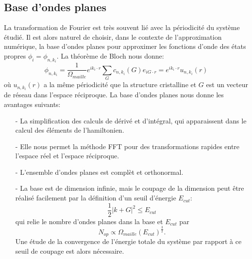\subsection{Base d'ondes planes}
\label{subsec-planewave}
La transformation de Fourier est très souvent lié avec la périodicité du système étudié.
Il est alors naturel de choisir, dans le contexte de l'approximation numérique,
la base d'ondes planes pour approximer les fonctions d'onde des états propres $\phi_i = \phi_{n,k_i}$.
La théorème de Bloch nous donne:
\begin{equation}
  \phi_{n,k_i} = \frac{1}{\Omega_{maille}}e^{ik_i\cdot r}\sum_G c_{n,k_i}(G)e_{iG\cdot r} = e^{ik_i\cdot r} u_{n,k_i}(r)
\end{equation}
où $u_{n,k_i}(r)$ a la même périodicité que la structure cristalline
et $G$ est un vecteur de réseau dans l'espace réciproque.
La base d'ondes planes nous donne les avantages suivants:
\begin{itemize}
  \item[-] La simplification des calculs de dérivé et d'intégral,
    qui apparaissent dans le calcul des éléments de l'hamiltonien.
  \item[-] Elle nous permet la méthode FFT pour des transformations rapides entre l'espace réel et l'espace réciproque.
  \item[-] L'ensemble d'ondes planes est complèt et orthonormal.
  \item[-] La base est de dimension infinie, mais le coupage de la dimension peut être réalisé facilement
    par la définition d'un seuil d'énergie $E_{cut}$:
    \begin{equation}
      \frac{1}{2}|k+G|^2 \leq E_{cut}
    \end{equation}
    qui relie le nombre d'ondes planes dans la base et $E_{cut}$ par
    \begin{equation}
      N_{op}\propto \Omega_{maille}{(E_{cut})}^{\frac{3}{2}}.
    \end{equation}
    Une étude de la convergence de l'énergie totale du système par rapport à ce seuil de coupage est alors nécessaire.
\end{itemize}

